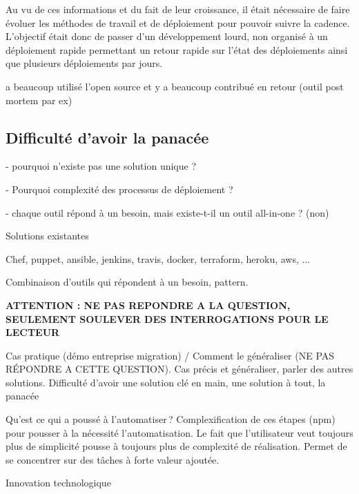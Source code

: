 Au vu de ces informations et du fait de leur croissance, il était nécessaire de faire évoluer les méthodes de travail et de déploiement pour pouvoir suivre la cadence. L'objectif était donc de passer d'un développement lourd, non organisé à un déploiement rapide permettant un retour rapide sur l'état des déploiements ainsi que plusieurs déploiements par jours.


a beaucoup utilisé l'open source et y a beaucoup contribué en retour (outil post mortem par ex) %

\subsection{Difficulté d'avoir la panacée}


- pourquoi n'existe pas une solution unique ? 

- Pourquoi complexité des processus de déploiement ? 

- chaque outil répond à un besoin, mais existe-t-il un outil all-in-one ? (non)

Solutions existantes

Chef, puppet, ansible, jenkins, travis, docker, terraform, heroku, aws, ...

Combinaison d'outils qui répondent à un besoin, pattern.


\textbf{ATTENTION : NE PAS REPONDRE A LA QUESTION, SEULEMENT SOULEVER DES INTERROGATIONS POUR LE LECTEUR}

Cas pratique (démo entreprise migration) / Comment le généraliser (NE PAS RÉPONDRE A CETTE QUESTION). Cas précis et généraliser, parler des autres solutions. Difficulté d'avoir une solution clé en main, une solution à tout, la panacée

Qu'est ce qui a poussé à l'automatiser ? Complexification de ces étapes (npm) pour pousser à la nécessité l'automatisation. Le fait que l'utilisateur veut toujours plus de simplicité pousse à toujours plus de complexité de réalisation. Permet de se concentrer sur des tâches à forte valeur ajoutée.

Innovation technologique 